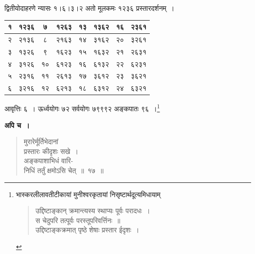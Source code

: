 \documentclass[11pt, openany]{book}
\begin{document}
द्वितीयोदाहरणे न्यासः १।६।३।२ अतो मूलकमः १२३६ प्रस्तारदर्शनम्~।

\begin{table}[h]
	\centering
	\begin{tabular}{|c|c|c|c|c|c|c|c|}
		\hline
{\hbox{१}} & {\hbox{१२३६}} & {\hbox{७}} & {\hbox{१२६३}} & {\hbox{१३}} & {\hbox{१३६२}} & {\hbox{१६}} & {\hbox{२३६१}}\\
\hline
{\hbox{२}} & {\hbox{२१३६}} & {\hbox{८}} & {\hbox{२१६३}} & {\hbox{१४}} & {\hbox{३१६२}} & {\hbox{२०}} & {\hbox{३२६१}}\\
\hline
{\hbox{३}} & {\hbox{१३२६}} & {\hbox{९}} & {\hbox{१६२३}} & {\hbox{१५}} & {\hbox{१६३२}} & {\hbox{२१}} & {\hbox{२६३१}}\\
\hline
{\hbox{४}} & {\hbox{३१२६}} & {\hbox{१०}} & {\hbox{६१२३}} & {\hbox{१६}} & {\hbox{६१३२}} & {\hbox{२२}} & {\hbox{६२३१}}\\
\hline
{\hbox{५}} & {\hbox{२३१६}} & {\hbox{११}} & {\hbox{२६१३}} & {\hbox{१७}} & {\hbox{३६१२}} & {\hbox{२३}} & {\hbox{३६२१}}\\
\hline	
{\hbox{६}} & {\hbox{३२१६}} & {\hbox{१२}} & {\hbox{६२१३}} & {\hbox{१८}} & {\hbox{६३१२}} & {\hbox{२४}} & {\hbox{६३२१}}\\
\hline
\end{tabular}
\end{table}
\qquad आवृत्तिः ६~। ऊर्ध्वयोगः ७२ सर्वयोगः ७९९९२ अङ्कपातः ९६~।\renewcommand{\thefootnote}{}\footnote{भास्करलीलावतीटीकायां मुनीश्वरकृतायां निसृष्टार्थदूत्यमिधायाम्

\begin{quote}
{\qt उद्दिष्टाङ्कान् क्रमान्त्यस्य स्थाप्यः पूर्वः परादधः~।\\
स चेदुपरि तत्पूर्वः परस्तूपरिवर्त्तिनः~॥\\
उद्दिष्टाङ्कक्रमात् पृष्ठे शेषाः प्रस्तार ईदृशः~।}
\end{quote}
}

\newpage

\textbf{अपि च~।} 

\begin{quote}
{\ex मुरारेर्मूर्तिभेदानां\\
प्रस्तारः कीदृशः सखे~।\\
अङ्कपाशाभिधं वारि-\\
निधिं तर्तुं क्षमोऽसि चेत्~॥~१७~॥	}
\end{quote}
\end{document}
